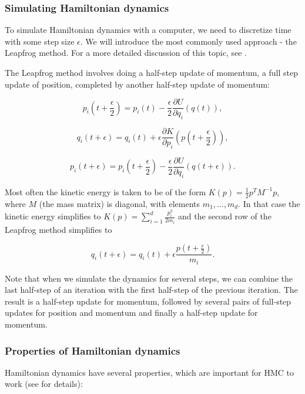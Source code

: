 \documentclass{book}
\theoremstyle{plain}%
\theoremstyle{definition}
\begin{document}
\subsubsection*{Simulating Hamiltonian dynamics}

To simulate Hamiltonian dynamics with a computer, we need to discretize time with some step size $\epsilon$. We will introduce the most commonly used approach - the Leapfrog method. For a more detailed discussion of this topic, see \cite{Neal2011}.

The Leapfrog method involves doing a half-step update of momentum, a full step update of position, completed by another half-step update of momentum:

$$p_i(t + \frac{\epsilon}{2}) = p_i(t) - \frac{\epsilon}{2} \frac{\partial U}{\partial q_i}(q(t)),$$

$$q_i(t + \epsilon) = q_i(t) +  \epsilon \frac{\partial K}{\partial p_i}(p(t + \frac{\epsilon}{2} )),$$

$$p_i(t + \epsilon) = p_i(t + \frac{\epsilon}{2}) - \frac{\epsilon}{2} \frac{\partial U}{\partial q_i}(q(t + \epsilon)).$$

Most often the kinetic energy is taken to be of the form $K(p) = \frac{1}{2}p^T M^{-1} p$, where $M$ (the mass matrix) is diagonal, with elements $m_1,...,m_d$. In that case the kinetic energy simplifies to $K(p) = \sum_{i=1}^d \frac{p^2_i}{2m_i}$ and the second row of the Leapfrog method simplifies to

$$q_i(t + \epsilon) = q_i(t) +  \epsilon \frac{p(t + \frac{\epsilon}{2})}{m_i}.$$

Note that when we simulate the dynamics for several steps, we can combine the last half-step of an iteration with the first half-step of the previous iteration. The result is a half-step update for momentum, followed by several pairs of full-step updates for position and momentum and finally a half-step update for momentum.

\subsubsection*{Properties of Hamiltonian dynamics}

Hamiltonian dynamics have several properties, which are important for HMC to work (see \cite{Neal2011} for details):
\end{document}
